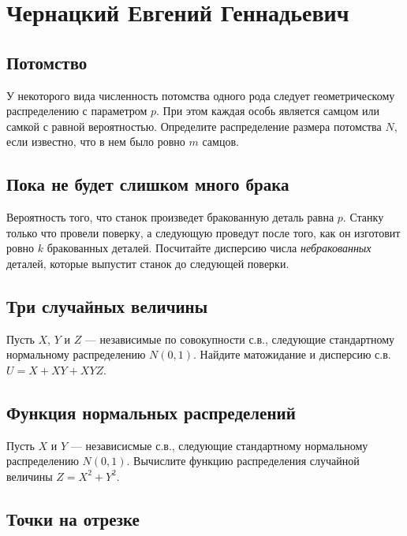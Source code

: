 \documentclass[12pt]{article}
\begin{document}
\newpage
\section{Чернацкий Евгений Геннадьевич}

\subsection{Потомство}

У некоторого вида численность потомства одного рода следует геометрическому распределению с параметром $p$. При этом каждая особь является самцом или самкой с равной вероятностью. Определите распределение размера потомства $N$, если известно, что в нем было ровно $m$ самцов.



\subsection{Пока не будет слишком много брака}

Вероятность того, что станок произведет бракованную деталь равна $p$. Станку только что провели поверку, а следующую проведут после того, как он изготовит ровно $k$ бракованных деталей. Посчитайте дисперсию числа \emph{небракованных} деталей, которые выпустит станок до следующей поверки.



\subsection{Три случайных величины}

Пусть $X$, $Y$ и $Z$ --- независимые по совокупности с.в., следующие стандартному нормальному распределению $N(0, 1)$. Найдите матожидание и дисперсию с.в. $U = X + XY + XYZ$. 



\subsection{Функция нормальных распределений}

Пусть $X$ и $Y$ --- независисмые с.в., следующие стандартному нормальному распределению $N(0, 1)$. Вычислите функцию распределения случайной величины $Z = X^2 + Y^2$.



\subsection{Точки на отрезке}
\end{document}
